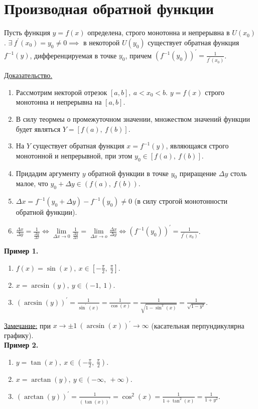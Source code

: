 \documentclass{article}
\begin{document}
\section*{Производная обратной функции}

\begin{theorem}
    Пусть функция \(y = f(x)\) определена, строго монотонна и непрерывна в \(U(x_0)\).
    \(\exists\ f^{\prime}(x_0) = y_0 \neq 0 \implies\) в некоторой \(U(y_0)\) существует обратная функция \(f^{-1}(y)\), дифференцируемая в точке \(y_0\), причем \(\displaystyle (f^{-1}(y_0))^{\prime} = \frac{1}{f^{\prime}(x_0)}\).    
\end{theorem}
\noindent
\underline{Доказательство.}
\begin{enumerate}
    \item Рассмотрим некторой отрезок \({[a, b]},\ a < x_0 < b\). \(y = f(x)\) строго монотонна и непрерывна на \({[a, b]}\).
    \item В силу теормеы о промежуточном значении, множеством значений функции будет являться \(Y = \left[f(a),\ f(b)\right]\).
    \item На \(Y\) существует обратная функция \(x = f^{-1}(y)\), являющаяся строго монотонной и непрерывной, при этом \(y_0 \in \left[f(a),\ f(b)\right]\).
    \item Придадим аргументу \(y\) обратной функции в точке \(y_0\) приращение \(\Delta y\) столь малое, что \(y_0 + \Delta y \in \left(f(a),\ f(b)\right)\).
    \item \(\Delta x = f^{-1}(y_0 + \Delta y) - f^{-1}(y_0) \neq 0\) (в силу строгой монотонности обратной функции).
    \item \(\displaystyle \frac{\Delta x}{\Delta y} = \frac{1}{\frac{\Delta y}{\Delta x}} \iff \lim\limits_{\Delta x \to 0} \frac{1}{\frac{\Delta y}{\Delta x}} = \lim\limits_{\Delta x \to o} \frac{\Delta x}{\Delta y} \iff (f^{-1}(y_0))^{\prime} = \frac{1}{f^{\prime}(x_0)}\).       
\end{enumerate}
\noindent
\textbf{Пример 1.}
\begin{enumerate}
    \item \(\displaystyle f(x) = \sin(x),\ x \in \left[-\frac{\pi}{2},\ \frac{\pi}{2}\right]\).
    \item \(x = \arcsin(y),\ y \in \left(-1,\ 1\right)\).
    \item \(\displaystyle (\arcsin(y))^{\prime} = \frac{1}{\sin^{\prime}(x)} = \frac{1}{\cos(x)} = \frac{1}{\sqrt{1 - \sin^2(x)}} = \frac{1}{\sqrt{1 - y^2}}\).    
\end{enumerate}
\noindent
\underline{Замечание:} при \(x \to \pm 1\ (\arcsin(x))^{\prime} \to \infty\) (касательная перпундикулярна графику).\\[0.15cm]
\textbf{Пример 2.}
\begin{enumerate}
    \item \(\displaystyle y = \tan(x),\ x \in \left(-\frac{\pi}{2},\ \frac{\pi}{2}\right)\).
    \item \(x = \arctan(y),\ y \in \left(-\infty,\ +\infty\right)\).
    \item \(\displaystyle (\arctan(y))^{\prime} = \frac{1}{(\tan(x))^{\prime}} = \cos^2(x) = \frac{1}{1 + \tan^2(x)} = \frac{1}{1 + y^2}\).   
\end{enumerate}
\end{document}
